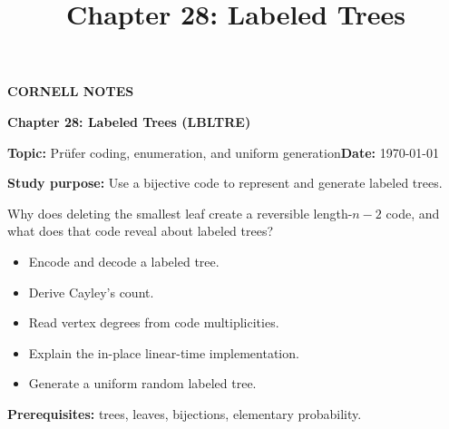 \documentclass[10pt,letterpaper]{article}
\title{Chapter 28: Labeled Trees}
\author{}
\date{}
\begin{document}
\maketitle
\begin{tcolorbox}[colback=Paper,colframe=Ink]{\small\bfseries\color{Teal}CORNELL NOTES}\par{\LARGE\bfseries Chapter 28: Labeled Trees (LBLTRE)}\par\medskip\textbf{Topic:} Pr\"ufer coding, enumeration, and uniform generation\hfill\textbf{Date:} \today\par\textbf{Study purpose:} Use a bijective code to represent and generate labeled trees.\end{tcolorbox}
\begin{tcolorbox}[colback=Teal!5,colframe=Teal,title=Essential question]Why does deleting the smallest leaf create a reversible length-$n-2$ code, and what does that code reveal about labeled trees?\end{tcolorbox}
\begin{tcolorbox}[colback=white,colframe=Mist,title=Learning objectives]\begin{itemize}\item Encode and decode a labeled tree.\item Derive Cayley's count.\item Read vertex degrees from code multiplicities.\item Explain the in-place linear-time implementation.\item Generate a uniform random labeled tree.\end{itemize}\textbf{Prerequisites:} trees, leaves, bijections, elementary probability.\end{tcolorbox}
\end{document}
